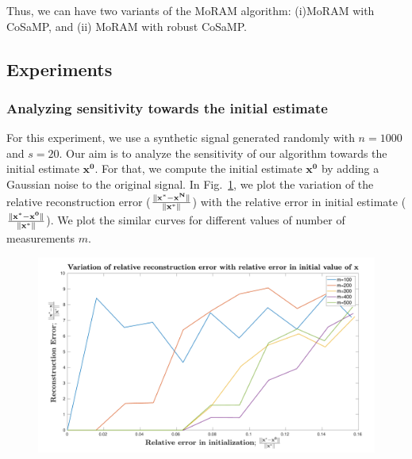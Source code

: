 Thus, we can have two variants of the MoRAM algorithm: (i)MoRAM with CoSaMP, and (ii) MoRAM with robust CoSaMP. 


%


\subsection{Experiments}

\subsubsection{Analyzing sensitivity towards the initial estimate}
For this experiment, we use a synthetic signal generated randomly with $n=1000$ and $s=20$. 
Our aim is to analyze the sensitivity of our algorithm towards the initial estimate $\mathbf{x^0}$. %
For that, we compute the initial estimate $\mathbf{x^0}$ by adding a Gaussian noise to the original signal. In Fig.~\ref{fig:pl}, we plot the variation of the relative reconstruction error ($\frac{\|\mathbf{x^*-x^N}\|}{\|\mathbf{x^*}\|}$) with the relative error in initial estimate ($\frac{\|\mathbf{x^*-x^0}\|}{\|\mathbf{x^*}\|}$). We plot the similar curves for different values of number of measurements $m$.
\begin{figure}[t]
	\begin{center}
		\includegraphics[width=\linewidth]{./fig/graph.pdf}
	\end{center}
	\caption{}
	\label{fig:pl}
\end{figure}

